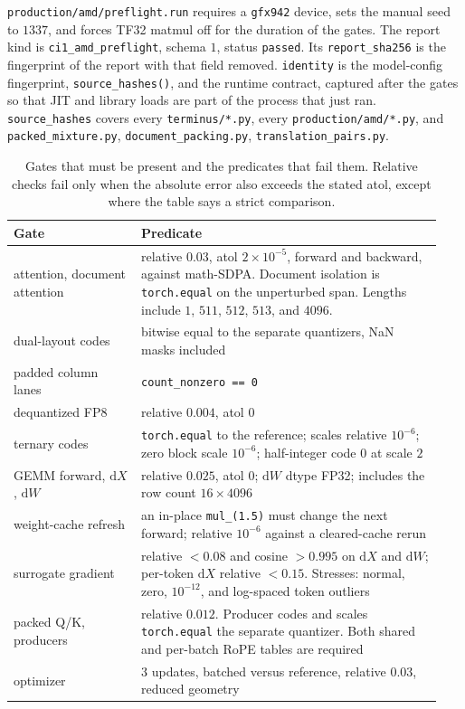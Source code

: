 \documentclass[11pt]{article}
\DeclareRobustCommand{\code}[1]{\texttt{#1}}
\begin{document}
\code{production/amd/preflight.run} requires a \code{gfx942} device, sets
the manual seed to \(1337\), and forces TF32 matmul off for the duration of
the gates. The report kind is \code{ci1\_amd\_preflight}, schema \(1\),
status \code{passed}. Its \code{report\_sha256} is the fingerprint of the
report with that field removed. \code{identity} is the model-config
fingerprint, \code{source\_hashes()}, and the runtime contract, captured
after the gates so that JIT and library loads are part of the process that
just ran. \code{source\_hashes} covers every \code{terminus/*.py}, every
\code{production/amd/*.py}, and
\code{packed\_mixture.py}, \code{document\_packing.py},
\code{translation\_pairs.py}.

\begin{table}[t]
\centering
\caption{Gates that must be present and the predicates that fail them.
Relative checks fail only when the absolute error also exceeds the stated
atol, except where the table says a strict comparison.}
\label{tab:gates}
\small
\begin{tabular}{@{}L{0.28\linewidth}L{0.66\linewidth}@{}}
\toprule
Gate & Predicate \\
\midrule
attention, document attention & relative \(0.03\), atol \(2\times 10^{-5}\), forward and backward, against math-SDPA. Document isolation is \code{torch.equal} on the unperturbed span. Lengths include \(1\), \(511\), \(512\), \(513\), and \(4096\). \\
dual-layout codes & bitwise equal to the separate quantizers, NaN masks included \\
padded column lanes & \code{count\_nonzero == 0} \\
dequantized FP8 & relative \(0.004\), atol \(0\) \\
ternary codes & \code{torch.equal} to the reference; scales relative \(10^{-6}\); zero block scale \(10^{-6}\); half-integer code \(0\) at scale \(2\) \\
GEMM forward, \(\mathrm{d}X\), \(\mathrm{d}W\) & relative \(0.025\), atol \(0\); \(\mathrm{d}W\) dtype FP32; includes the row count \(16\times 4096\) \\
weight-cache refresh & an in-place \code{mul\_(1.5)} must change the next forward; relative \(10^{-6}\) against a cleared-cache rerun \\
surrogate gradient & relative \(<0.08\) and cosine \(>0.995\) on \(\mathrm{d}X\) and \(\mathrm{d}W\); per-token \(\mathrm{d}X\) relative \(<0.15\). Stresses: normal, zero, \(10^{-12}\), and log-spaced token outliers \\
packed Q/K, producers & relative \(0.012\). Producer codes and scales \code{torch.equal} the separate quantizer. Both shared and per-batch RoPE tables are required \\
optimizer & \(3\) updates, batched versus reference, relative \(0.03\), reduced geometry \\
\bottomrule
\end{tabular}
\end{table}
\end{document}
